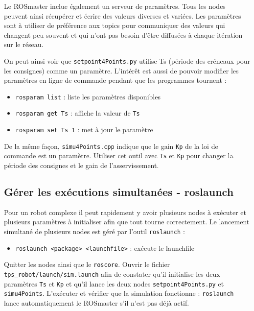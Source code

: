 \documentclass[12pt,a4paper]{article}
\begin{document}
Le ROSmaster inclue également un serveur de paramètres. Tous les nodes peuvent ainsi récupérer et écrire des valeurs diverses et variées.
Les paramètres sont à utiliser de préférence aux topics pour communiquer des valeurs qui changent peu souvent et qui n'ont pas besoin d'être diffusées à chaque itération sur le réseau.

On peut ainsi voir que \texttt{setpoint4Points.py} utilise Ts (période des créneaux pour les consignes) comme un paramètre. L'intérêt est aussi de pouvoir modifier les paramètres en ligne de commande pendant que les programmes tournent :
\begin{itemize}
\item \texttt{rosparam list} : liste les paramètres disponibles
\item \texttt{rosparam get Ts} : affiche la valeur de \texttt{Ts}
\item \texttt{rosparam set Ts 1} : met à jour le paramètre
\end{itemize}
De la même façon, \texttt{simu4Points.cpp} indique que le gain \texttt{Kp} de la loi de commande est un paramètre.
Utiliser cet outil avec \texttt{Ts} et \texttt{Kp} pour changer la période des consignes et le gain de l'asservissement.

\subsection{Gérer les exécutions simultanées - roslaunch}

Pour un robot complexe il peut rapidement y avoir plusieurs nodes à exécuter et plusieurs paramètres à initialiser afin que tout tourne correctement. Le lancement simultané de plusieurs nodes est géré par l'outil \texttt{roslaunch} :
\begin{itemize}
\item \texttt{roslaunch <package> <launchfile>} : exécute le launchfile
\end{itemize}
Quitter les nodes ainsi que le \texttt{roscore}.
Ouvrir le fichier \texttt{tps\_robot/launch/sim.launch} afin de constater qu'il initialise les deux paramètres \texttt{Ts} et \texttt{Kp} et qu'il lance les deux nodes \texttt{setpoint4Points.py} et \texttt{simu4Points}.
L'exécuter et vérifier que la simulation fonctionne : \texttt{roslaunch} lance automatiquement le ROSmaster s'il n'est pas déjà actif.
\end{document}
